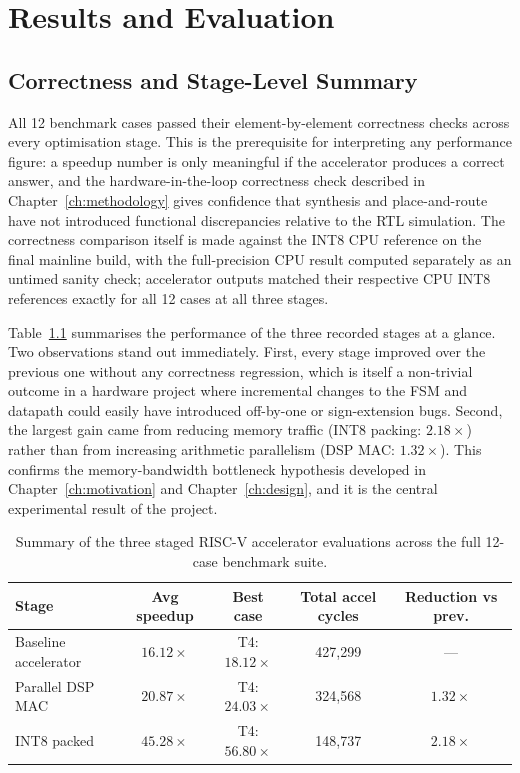 \chapter{Results and Evaluation}
\label{ch:results}

\section{Correctness and Stage-Level Summary}

All 12 benchmark cases passed their element-by-element correctness checks
across every optimisation stage. This is the prerequisite for
interpreting any performance figure: a speedup number is only meaningful
if the accelerator produces a correct answer, and the hardware-in-the-loop
correctness check described in Chapter~\ref{ch:methodology} gives
confidence that synthesis and place-and-route have not introduced
functional discrepancies relative to the RTL simulation. The correctness
comparison itself is made against the INT8 CPU reference on the final
mainline build, with the full-precision CPU result computed separately
as an untimed sanity check; accelerator outputs matched their respective
CPU INT8 references exactly for all 12 cases at all three stages.

Table~\ref{tab:stage-summary} summarises the performance of the three
recorded stages at a glance. Two observations stand out immediately.
First, every stage improved over the previous one without any correctness
regression, which is itself a non-trivial outcome in a hardware project
where incremental changes to the FSM and datapath could easily have
introduced off-by-one or sign-extension bugs. Second, the largest gain
came from reducing memory traffic (INT8 packing: $2.18\times$) rather
than from increasing arithmetic parallelism (DSP MAC: $1.32\times$). This
confirms the memory-bandwidth bottleneck hypothesis developed in
Chapter~\ref{ch:motivation} and Chapter~\ref{ch:design}, and it is the
central experimental result of the project.

\begin{table}[htbp]
  \centering
  \small
  \begin{tabular}{lcccc}
  \toprule
  Stage & Avg speedup & Best case & Total accel cycles & Reduction vs prev. \\
  \midrule
  Baseline accelerator & $16.12\times$ & T4: $18.12\times$ & 427,299 & --- \\
  Parallel DSP MAC     & $20.87\times$ & T4: $24.03\times$ & 324,568 & $1.32\times$ \\
  INT8 packed          & $45.28\times$ & T4: $56.80\times$ & 148,737 & $2.18\times$ \\
  \bottomrule
  \end{tabular}
  \caption{Summary of the three staged RISC-V accelerator evaluations
           across the full 12-case benchmark suite.}
  \label{tab:stage-summary}
\end{table}

